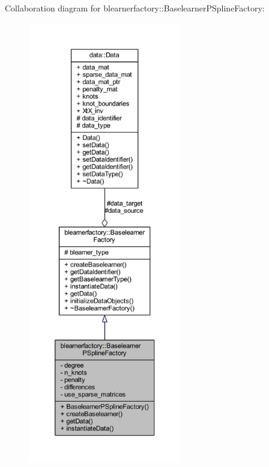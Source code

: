 Collaboration diagram for blearnerfactory\+:\+:Baselearner\+P\+Spline\+Factory\+:\nopagebreak
\begin{figure}[H]
\begin{center}
\leavevmode
\includegraphics[height=550pt]{classblearnerfactory_1_1_baselearner_p_spline_factory__coll__graph}
\end{center}
\end{figure}

